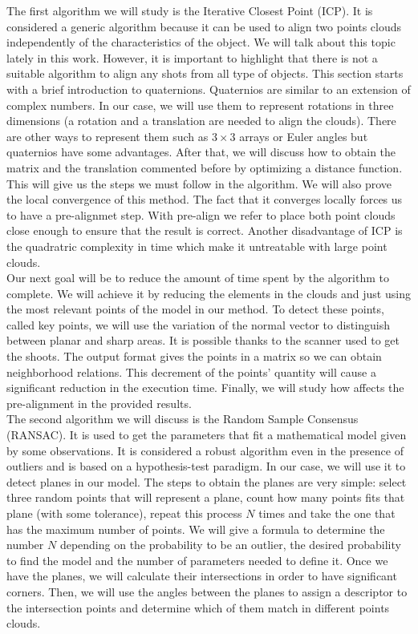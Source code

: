 The first algorithm we will study is the Iterative Closest Point (ICP). It is considered a generic algorithm because it can be used to align two points clouds independently of the characteristics of the object. We will talk about this topic lately in this work. However, it is important to highlight that there is not a suitable algorithm to align any shots from all type of objects. This section starts with a brief introduction to quaternions. Quaternios are similar to an extension of complex numbers. In our case, we will use them to represent rotations in three dimensions (a rotation and a translation are needed to align the clouds). There are other  ways to represent them such as $ 3 \times 3$ arrays or Euler angles but quaternios have some advantages. After that, we will discuss how to obtain the matrix and the translation commented before by optimizing a distance function. This will give us the steps we must follow in the algorithm. We will also prove the local convergence of this method. The fact that it converges locally forces us to have a pre-alignmet step. With pre-align we refer to place both point clouds close enough  to ensure that the result is correct. Another disadvantage of ICP is the quadratric complexity in time which make it untreatable with large point clouds. \\

Our next goal will be to reduce the amount of time spent by the algorithm to complete. We will achieve it by reducing the elements in the clouds and just using the most relevant points of the model in our method. To detect these points, called key points, we will use the variation of the normal vector to distinguish between planar and sharp areas. It is possible thanks to the scanner used to get the shoots. The output format gives the points in a matrix so we can obtain neighborhood relations. This decrement of the points' quantity will cause a significant reduction in the execution time. Finally, we will study how affects the pre-alignment in the provided results.  \\

The second algorithm we will discuss is the Random Sample Consensus (RANSAC). It is used to get the parameters that fit a mathematical model given by some observations. It is considered a robust algorithm even in the presence of outliers and is based on a hypothesis-test paradigm. In our case, we will use it to detect planes in our model. The steps to obtain the planes are very simple: select three random points that will represent a plane, count how many points fits that plane (with some tolerance), repeat this process $ N $ times and take the one that has the maximum number of points. We will give a formula to determine the number $ N $ depending on the probability to be an outlier, the desired probability to find the model and the number of parameters needed to define it. Once we have the planes, we will calculate their intersections in order to have significant corners. Then, we will use the angles between the planes to assign a descriptor to the intersection points and determine which of them match in different points clouds.\\

